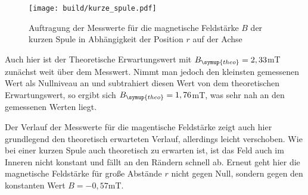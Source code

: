 \begin{figure}
  \centering
  \texttt{[image: build/kurze\_spule.pdf]}
  \caption{Auftragung der Messwerte für die magnetische Feldstärke $B$ der kurzen Spule
  in Abhängigkeit der Position $r$ auf der Achse}
  \label{fig:kurze_spule}
\end{figure}


Auch hier ist der Theoretische Erwartungswert mit $B_{\symup{theo}}=2,33$mT zunächst
weit über dem Messwert. Nimmt man jedoch den kleinsten gemessenen Wert als Nullniveau
an und subtrahiert diesen Wert von dem theoretischen Erwartungswert, so ergibt sich
$B_{\symup{theo}}=1,76$mT, was sehr nah an den gemessenen Werten liegt.

Der Verlauf der Messwerte für die magentische Feldstärke zeigt auch hier grundlegend
den theoretisch erwarteten Verlauf, allerdings leicht verschoben. Wie bei einer kurzen Spule auch theoretisch
zu erwarten ist, ist das Feld auch im Inneren nicht konstant und fällt an den Rändern
schnell ab. Erneut geht hier die magnetische Feldstärke für große Abstände $r$ nicht
gegen Null, sondern gegen den konstanten Wert $B=-0,57$mT.


